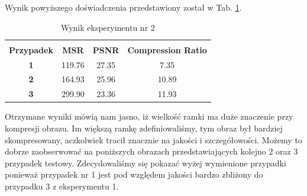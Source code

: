 \documentclass[12pt]{article}
\begin{document}
Wynik powyższego doświadczenia przedstawiony został w Tab.
\ref{wynik eksperymentu 2}.

\begin{table}[h!]
 \caption{Wynik eksperymentu nr 2}
 \centering
 \vspace{0.2cm}
 \begin{tabular}{c c c c}
  \hline\hline\\[-0.4cm]
  \textbf{Przypadek} & \textbf{MSR} & \textbf{PSNR} & \textbf{Compression Ratio} \\[0.1cm]
  \textbf{1} & 119.76 & 27.35 & 7.35  \\
  \textbf{2} & 164.93 & 25.96 & 10.89  \\
  \textbf{3} & 299.90 & 23.36 & 11.93  \\ [0.1cm]
  \hline
 \end{tabular}
 \label{wynik eksperymentu 2}
\end{table}

Otrzymane wyniki mówią nam jasno, iż wielkość ramki ma duże znaczenie przy kompresji obrazu. Im większą ramkę zdefiniowaliśmy, tym obraz był bardziej skompresowany, aczkolwiek tracił znacznie na jakości i szczegółowości. Możemy to dobrze zaobserwować na poniższych obrazach przedstawiających kolejno 2 oraz 3 przypadek testowy. Zdecydowaliśmy się pokazać wyżej wymienione przypadki ponieważ przypadek nr 1 jest pod względem jakości bardzo zbliżony do przypadku 3 z eksperymentu 1.
\end{document}

